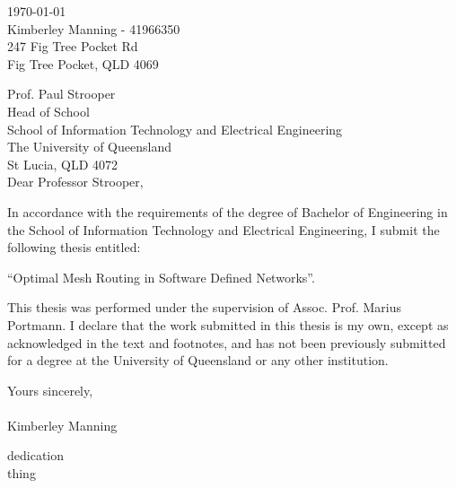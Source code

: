 \begin{flushright}
        \today\\
        Kimberley Manning - 41966350\\
        247 Fig Tree Pocket Rd\\
        Fig Tree Pocket, QLD 4069\\
        \medskip

\end{flushright}
\begin{flushleft}
  Prof. Paul Strooper\\
  Head of School\\
  School of Information Technology and Electrical Engineering\\
  The University of Queensland\\
  St Lucia, QLD 4072\\
  \bigskip\bigskip
  Dear Professor Strooper,\\
\end{flushleft}
In accordance with the requirements of the degree of Bachelor of Engineering in the School of Information Technology and Electrical Engineering, I submit the following thesis entitled:
\begin{center}
        ``Optimal Mesh Routing in Software Defined Networks''.\\
\end{center}
This thesis was performed under the supervision of Assoc. Prof. Marius Portmann. I declare that the work submitted in this thesis is my own, except as acknowledged in the text and footnotes, and has not been previously submitted for a degree at the University of Queensland or any other institution.



\begin{flushleft}
        \medskip
        Yours sincerely,\\
        \bigskip
        \emph\\
        \bigskip
    Kimberley Manning
\end{flushleft}

\cleardoublepage
\vspace*{70mm}
\begin{center}
\renewcommand{\baselinestretch}{1.0}
\sl


dedication \\
thing


\end{center}

